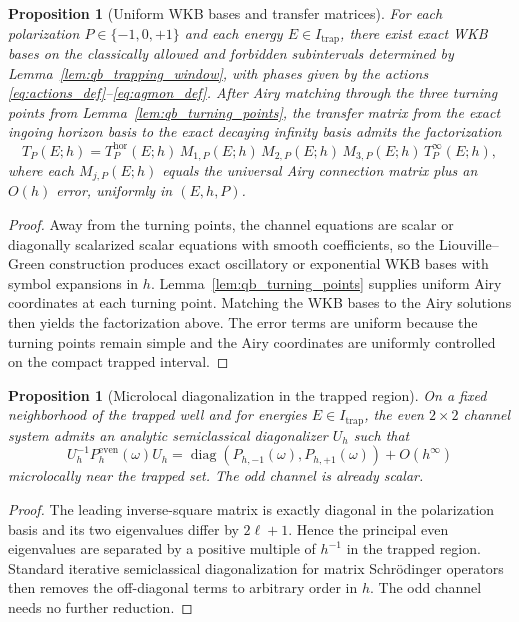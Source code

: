 \documentclass[12pt]{article}
\numberwithin{equation}{section}
\theoremstyle{plain}
\newtheorem{proposition}[theorem]{Proposition}
\theoremstyle{definition}
\theoremstyle{remark}
\newcommand{\diag}{\operatorname{diag}}
\begin{document}
\begin{proposition}[Uniform WKB bases and transfer matrices]\label{prop:qb_wkb_matching}
For each polarization $P\in\{-1,0,+1\}$ and each energy $E\in I_{\mathrm{trap}}$, there exist exact WKB bases on the classically allowed and forbidden subintervals determined by Lemma~\ref{lem:qb_trapping_window}, with phases given by the actions \eqref{eq:actions_def}--\eqref{eq:agmon_def}.  After Airy matching through the three turning points from Lemma~\ref{lem:qb_turning_points}, the transfer matrix from the exact ingoing horizon basis to the exact decaying infinity basis admits the factorization
\[
   T_P(E;h)=T^{\mathrm{hor}}_P(E;h)\,M_{1,P}(E;h)\,M_{2,P}(E;h)\,M_{3,P}(E;h)\,T^{\infty}_P(E;h),
\]
where each $M_{j,P}(E;h)$ equals the universal Airy connection matrix plus an $O(h)$ error, uniformly in $(E,h,P)$.
\end{proposition}

\begin{proof}
Away from the turning points, the channel equations are scalar or diagonally scalarized scalar equations with smooth coefficients, so the Liouville--Green construction produces exact oscillatory or exponential WKB bases with symbol expansions in $h$.  Lemma~\ref{lem:qb_turning_points} supplies uniform Airy coordinates at each turning point.  Matching the WKB bases to the Airy solutions then yields the factorization above.  The error terms are uniform because the turning points remain simple and the Airy coordinates are uniformly controlled on the compact trapped interval.
\end{proof}

\begin{proposition}[Microlocal diagonalization in the trapped region]\label{prop:well_diag}
On a fixed neighborhood of the trapped well and for energies $E\in I_{\mathrm{trap}}$, the even $2\times2$ channel system admits an analytic semiclassical diagonalizer $U_h$ such that
\[
   U_h^{-1}P_h^{\mathrm{even}}(\omega)U_h
   =
   \diag(P_{h,-1}(\omega),P_{h,+1}(\omega))+O(h^\infty)
\]
microlocally near the trapped set.  The odd channel is already scalar.
\end{proposition}

\begin{proof}
The leading inverse-square matrix is exactly diagonal in the polarization basis and its two eigenvalues differ by $2\ell+1$.  Hence the principal even eigenvalues are separated by a positive multiple of $h^{-1}$ in the trapped region.  Standard iterative semiclassical diagonalization for matrix Schr\"odinger operators then removes the off-diagonal terms to arbitrary order in $h$.  The odd channel needs no further reduction.
\end{proof}
\end{document}
